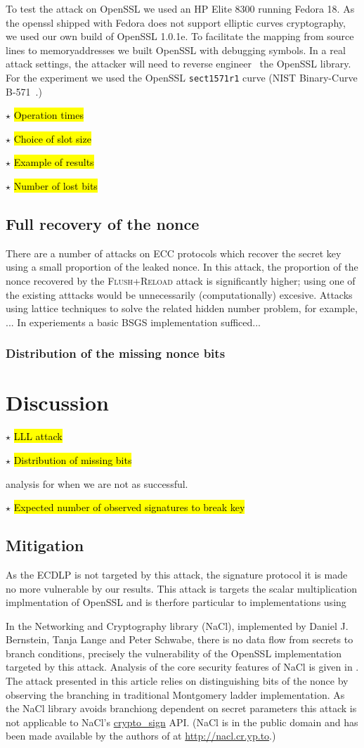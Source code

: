\documentclass{llncs}
\newcommand{\starpar}[1]{\par{\footnotesize $\star$ \hl{#1}\par}}
\begin{document}
To test the attack on OpenSSL we used an HP Elite 8300 
running Fedora 18.
As the openssl shipped with Fedora does not support elliptic curves cryptography,
we used our own build of OpenSSL 1.0.1e. 
To facilitate the mapping from source lines to memoryaddresses we built OpenSSL with debugging symbols.
In a real attack settings, the attacker will need to reverse engineer~\cite{cipsero10software}
the OpenSSL library.
For the experiment we used the OpenSSL \texttt{sect1571r1} curve (NIST Binary-Curve B-571~\cite{fips}.)


\starpar{Operation times}
\starpar{Choice of slot size}
\starpar{Example of results}
\starpar{Number of lost bits}

\subsection{Full recovery of the nonce}\label{sub:full_nonce}
There are a number of attacks on ECC protocols which recover the secret key using a small proportion of the leaked nonce. In this attack, the proportion of the nonce recovered by the \textsc{Flush+Reload} attack is significantly higher; using one of the existing atttacks would be unnecessarily (computationally) excesive. Attacks using lattice techniques to solve the related hidden number problem, for example, ... 
In experiements a basic BSGS implementation sufficed... 

\subsubsection*{Distribution of the missing nonce bits}

\section{Discussion}\label{sec:discussion}
\starpar{LLL attack}
\starpar{Distribution of missing bits} analysis for when we are not as successful. 
\starpar{Expected number of observed signatures to break key}


\subsection*{Mitigation}
As the ECDLP is not targeted by this attack, the signature protocol it is made no more vulnerable by our results. This attack is targets the scalar multiplication implmentation of OpenSSL and is therfore particular to implementations using 

In the Networking and Cryptography library (NaCl), implemented by Daniel J. Bernstein, Tanja Lange and Peter Schwabe, there is no data flow from secrets to branch conditions, precisely the vulnerability of the OpenSSL implementation targeted by this attack. Analysis of the core security features of NaCl is given in \cite{dan-tan-peter} . The attack presented in this article relies on distinguishing bits of the nonce by observing the branching in traditional Montgomery ladder implementation. As the NaCl library avoids branchiong dependent on secret parameters this attack is not applicable to NaCl's \url{crypto_sign} API. (NaCl is in the public domain and has been made available by the authors of \cite{dan-tan-peter} at \url{http://nacl.cr.yp.to}.)
\end{document}
